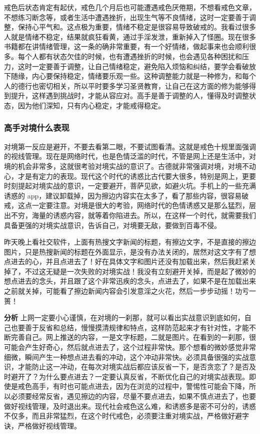 戒色后状态肯定有起伏，戒色几个月后也可能遭遇戒色厌倦期，不想看戒色文章，不想练习断念等，或者生活中遭遇挫折，出现生气等不良情绪，这时一定要善于调整，保持心平气和。这点极为重要，情绪不稳定是很容易导致破戒的。我看过很多人就是情绪不稳定，结果就疯狂看黄，通过手淫发泄，重新掉入了怪圈。现在很多书籍都在讲情绪管理，这一条的确非常重要，有一个好情绪，做起事来也会顺利很多。每个人都有状态欠佳的时候，也有遭遇挫折的时候，也会遇见各种困扰和压力，这时一定要善于调整，让自己情绪稳定，避免陷入烦恼和纠结，要学会看破放下随缘，内心要保持稳定，情绪要乐观一些。这种调整能力就是一种修为，和每个人的德行也密切相关，所以平时要多学习圣贤教育，让自己在这方面的修为能够得到提升，这样遇到挑战时，才能从容应对。高手是善于调整的人，懂得及时调整状态，因为他们深知，只有内心稳定，才能戒得稳定。

\subsubsection{高手对境什么表现}

对境第一反应是避开，不要去看第二眼，不要试图看清。这就是戒色十规里面强调的视线管理。现在是网络时代，也是色情泛滥的时代，不管是网上还是生活中，对境的机会非常多，这就很考验对境实战的意识了。古德就非常强调对境，对境不动心，才是有定力的表现。现代这个时代的诱惑比古代要大很多，特别是网上，更要时刻提起对境实战的意识，一定要避开，菩萨见欲，如避火坑。手机上的一些充满诱惑的 app，建议卸载掉，因为擦边内容实在太多了，看了那些内容，很容易破戒，这点一定要注意。对境是很大的考验，网络时代的色情诱惑又是那么猛烈，层出不穷，海量的诱惑内容，就等着你陷进去。所以，在这样一个时代，就需要我们具备更强的对境实战意识，告诉自己，对境要无敌，要做到百毒不侵。

\begin{case}
    昨天晚上看社交软件，上面有热搜文字新闻的标题，有擦边文字，不是直接的擦边图片，只是热搜新闻的标题在外面显示，是没有办法关闭的，居然对这文字有了想点进去的心，并且点进去了！好在具体文字和图片还没有加载出来，然后我赶紧关掉了，不过这无疑是一次失败的对境实战！我没有立刻避开关掉，而是起了微妙的想点进去的念头，并且跟了这个非常迅疾的念头，点进去了，如果不是在加载出来之前就关掉，可能看了擦边新闻内容会引发意淫之火花，然后一步步动摇！功亏一篑！

    \textbf{分析} 上网一定要小心谨慎，在对境的一刹那，就可以看出实战意识到底如何，自己也要善于反省和总结，慢慢摸清规律和特点，这样防范起来才有针对性，才能不断完善自己。网上推送的内容，一是文字标题，二就是图片。在看到的一刹那，很可能会产生好奇心，然后就点进去了，这个过程非常快。那个想看的微妙感觉非常细微，瞬间产生一种想点进去看的冲动，这个冲动非常快。必须具备很强的实战意识，才能防止这一冲动，在每次对境实战后都应该反省一下，是否贪恋了？是否及时避开了？为什么要点进去？一定要认真反省，不断优化自己的对境实战表现。即使是戒色高手，有时也可能点进去，因为在浏览的过程中，警惕性可能会下降，所以必须要经常反省，遇见擦边的内容，尽量不要点进去，如果不慎点进去了，也要做好视线管理，及时退出来。现代社会戒色这么难，和诱惑多是密不可分的，诱惑不仅多，而且非常猛烈，在这个时代戒色，必须要注重对境实战，严格做好避字诀，严格做好视线管理。
\end{case}

